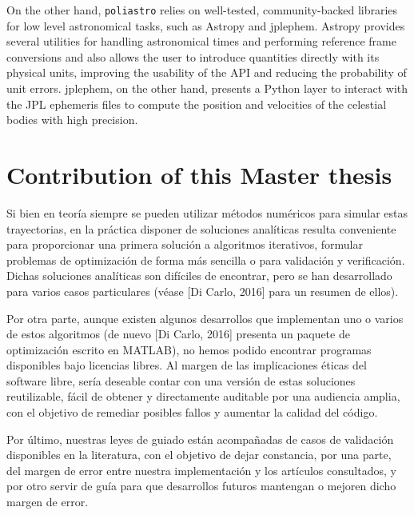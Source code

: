 On the other hand, \verb|poliastro| relies on well-tested, community-backed libraries for low level astronomical tasks, such as Astropy\cite{robitaille2013astropy} and jplephem. Astropy provides several utilities for handling astronomical times and performing reference frame conversions and also allows the user to introduce quantities directly with its physical units, improving the usability of the API and reducing the probability of unit errors. jplephem, on the other hand, presents a Python layer to interact with the JPL ephemeris files to compute the position and velocities of the celestial bodies with high precision.

\section{Contribution of this Master thesis}


Si bien en teoría siempre se pueden utilizar métodos numéricos para simular estas trayectorias, en la práctica disponer de soluciones analíticas resulta conveniente para proporcionar una primera solución a algoritmos iterativos, formular problemas de optimización de forma más sencilla o para validación y verificación. Dichas soluciones analíticas son difíciles de encontrar, pero se han desarrollado para varios casos particulares (véase [Di Carlo, 2016] para un resumen de ellos).

Por otra parte, aunque existen algunos desarrollos que implementan uno o varios de estos algoritmos (de nuevo [Di Carlo, 2016] presenta un paquete de optimización escrito en MATLAB), no hemos podido encontrar programas disponibles bajo licencias libres. Al margen de las implicaciones éticas del software libre, sería deseable contar con una versión de estas soluciones reutilizable, fácil de obtener y directamente auditable por una audiencia amplia, con el objetivo de remediar posibles fallos y aumentar la calidad del código.

Por último, nuestras leyes de guiado están acompañadas de casos de validación disponibles en la literatura, con el objetivo de dejar constancia, por una parte, del margen de error entre nuestra implementación y los artículos consultados, y por otro servir de guía para que desarrollos futuros mantengan o mejoren dicho margen de error.

\clearpage